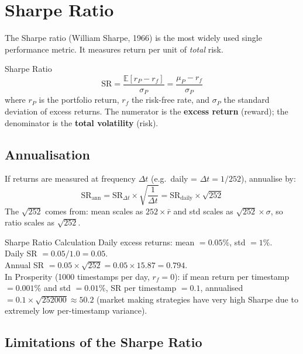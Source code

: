 \documentclass[12pt,a4paper,openany]{report}
\theoremstyle{definition}
\newcommand{\E}{\mathbb{E}}
\begin{document}
\section{Sharpe Ratio}

The Sharpe ratio (William Sharpe, 1966) is the most widely used single performance metric. It measures return per unit of \emph{total} risk.

\begin{definitionbox}{Sharpe Ratio}
\[
  \text{SR} = \frac{\E[r_P - r_f]}{\sigma_P} = \frac{\mu_P - r_f}{\sigma_P}
\]
where $r_P$ is the portfolio return, $r_f$ the risk-free rate, and $\sigma_P$ the standard deviation of excess returns. The numerator is the \textbf{excess return} (reward); the denominator is the \textbf{total volatility} (risk).
\end{definitionbox}

\subsection{Annualisation}

If returns are measured at frequency $\Delta t$ (e.g.\ daily = $\Delta t = 1/252$), annualise by:
\begin{equation}
  \text{SR}_{\text{ann}} = \text{SR}_{\Delta t} \times \sqrt{\frac{1}{\Delta t}} = \text{SR}_{\text{daily}} \times \sqrt{252}
\end{equation}
The $\sqrt{252}$ comes from: mean scales as $252\times\bar{r}$ and std scales as $\sqrt{252}\times\sigma$, so ratio scales as $\sqrt{252}$.

\begin{examplebox}{Sharpe Ratio Calculation}
Daily excess returns: mean $= 0.05\%$, std $= 1\%$. \\
Daily SR $= 0.05/1.0 = 0.05$. \\
Annual SR $= 0.05 \times \sqrt{252} = 0.05 \times 15.87 = 0.794$. \\
In Prosperity (1000 timestamps per day, $r_f = 0$): if mean return per timestamp $= 0.001\%$ and std $= 0.01\%$, SR per timestamp $= 0.1$, annualised $= 0.1 \times \sqrt{252000} \approx 50.2$ (market making strategies have very high Sharpe due to extremely low per-timestamp variance).
\end{examplebox}

\subsection{Limitations of the Sharpe Ratio}
\end{document}
